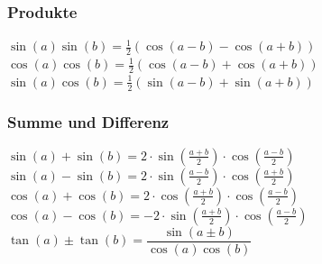 \subsubsection{Produkte}
		$\sin(a)\sin(b)=\frac{1}{2}(\cos(a-b)-\cos(a+b))$\\
		$\cos(a)\cos(b)=\frac{1}{2}(\cos(a-b)+\cos(a+b))$\\
		$\sin(a)\cos(b)=\frac{1}{2}(\sin(a-b)+\sin(a+b))$
		
\subsubsection{Summe und Differenz}
		$\sin(a)+\sin(b)=2 \cdot \sin \left(\frac{a+b}{2}\right) \cdot
		\cos\left(\frac{a-b}{2}\right)$\\
		$\sin(a)-\sin(b)=2 \cdot \sin \left(\frac{a-b}{2}\right) \cdot
		\cos\left(\frac{a+b}{2}\right)$\\
		$\cos(a)+\cos(b)=2 \cdot \cos \left(\frac{a+b}{2}\right) \cdot
		\cos\left(\frac{a-b}{2}\right)$\\
		$\cos(a)-\cos(b)=-2 \cdot \sin \left(\frac{a+b}{2}\right) \cdot
		\cos\left(\frac{a-b}{2}\right)$\\
		$\tan(a) \pm \tan(b)=\dfrac{\sin(a \pm b)}{\cos(a)\cos(b)}$		
	


